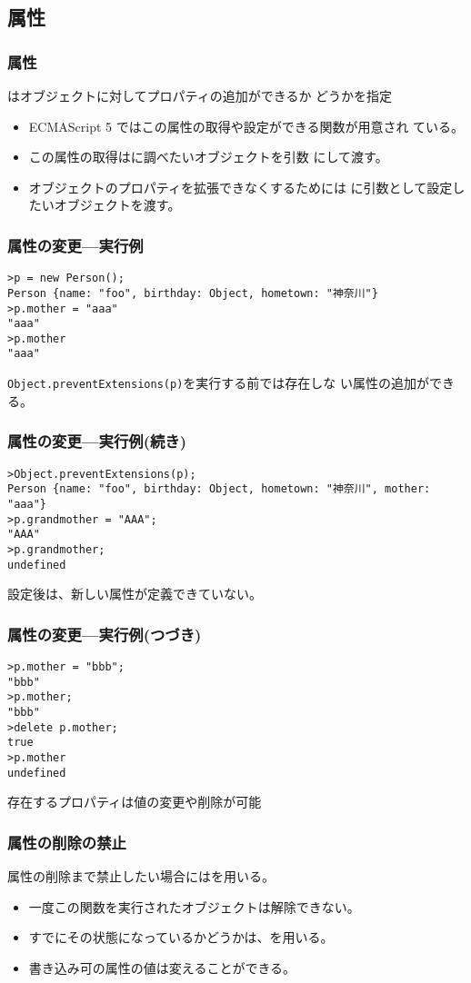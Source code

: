 \documentclass[dvipsk]{beamer}
\begin{document}
 \subsection{\protect{}属性}
 \begin{frame}[containsverbatim]
  \frametitle{\protect{}属性}
はオブジェクトに対してプロパティの追加ができるか
  どうかを指定
 \begin{itemize}
    \item ECMAScript 5 ではこの属性の取得や設定ができる関数が用意され
ている。
   \item この属性の取得はに調べたいオブジェクトを引数
にして渡す。
   \item オブジェクトのプロパティを拡張できなくするためには
に引数として設定したいオブジェクトを渡す。
  \end{itemize}
 \end{frame}
\begin{frame}[containsverbatim]
 \frametitle{\protect{}属性の変更---実行例}
\begin{verbatim}
>p = new Person();
Person {name: "foo", birthday: Object, hometown: "神奈川"}
>p.mother = "aaa"
"aaa"
>p.mother
"aaa"
\end{verbatim}
\texttt{Object.preventExtensions(p)}を実行する前では存在しな
 い属性の追加ができる。
 \end{frame}
\begin{frame}[containsverbatim]
 \frametitle{\protect{}属性の変更---実行例(続き)}
\begin{verbatim}
>Object.preventExtensions(p);
Person {name: "foo", birthday: Object, hometown: "神奈川", mother: "aaa"}
>p.grandmother = "AAA";
"AAA"
>p.grandmother;
undefined
\end{verbatim}
 設定後は、新しい属性が定義できていない。
 \end{frame}
\begin{frame}[containsverbatim]
\frametitle{\protect{}属性の変更---実行例(つづき)}
\begin{verbatim}
>p.mother = "bbb";
"bbb"
>p.mother;
"bbb"
>delete p.mother;
true
>p.mother
undefined
\end{verbatim}
存在するプロパティは値の変更や削除が可能
 \end{frame}
\begin{frame}[containsverbatim]
 \frametitle{属性の削除の禁止}
 属性の削除まで禁止したい場合にはを用いる。
 \begin{itemize}
  \item 一度この関数を実行されたオブジェクトは解除できない。
  \item すでにその状態になっているかどうかは、を用いる。
  \item 書き込み可の属性の値は変えることができる。
 \end{itemize}
 \end{frame}
\end{document}
